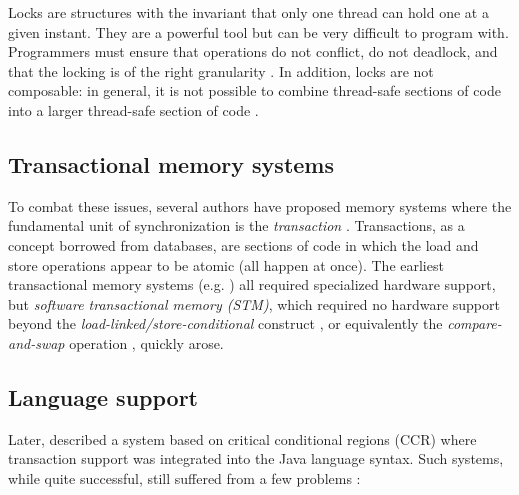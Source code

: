 \documentclass[a4paper]{acmtrans2m}
\begin{document}
Locks are structures with the invariant that only one thread can hold one at
a given instant. They are a powerful tool but can be very difficult to program
with. Programmers must ensure that operations do not conflict, do not deadlock,
and that the locking is of the right granularity \cite{Duffy:2010}. In addition,
locks are not composable: in general, it is not possible to combine thread-safe
sections of code into a larger thread-safe section of code \cite{Harris:2005}.

\subsection{Transactional memory systems}
To combat these issues, several authors have proposed memory systems where the
fundamental unit of synchronization is the \textit{transaction}
\cite{Harris:2007}. Transactions, as a concept borrowed from databases, are
sections of code in which the load and store operations appear to be atomic (all
happen at once). The earliest transactional memory systems
(e.g. \cite{Herlihy:1993}) all required specialized hardware support, but
\textit{software transactional memory (STM)}, which required no hardware support
beyond the \textit{load-linked/store-conditional} construct \cite{Shavit:1995}, or
equivalently the \textit{compare-and-swap} operation \cite{Harris:2003}, quickly
arose.

\subsection{Language support}

Later,  described a system based on critical conditional
regions (CCR) \cite{Hoare:1972} where transaction support was integrated into
the Java language syntax. Such systems, while quite successful, still suffered
from a few problems \cite{Harris:2005,Duffy:2010}:
\end{document}
